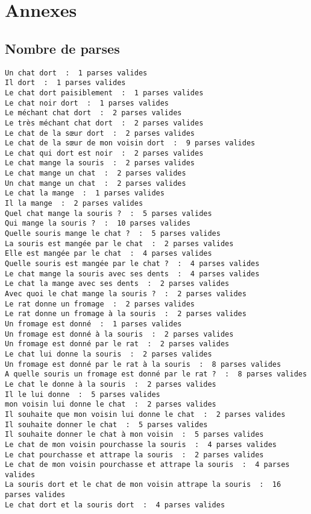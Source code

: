 \documentclass[12pt]{article}
\theoremstyle{exostyle}
\begin{document}
\section{Annexes}

\subsection{Nombre de parses}
\begin{verbatim}
Un chat dort  :  1 parses valides
Il dort  :  1 parses valides
Le chat dort paisiblement  :  1 parses valides
Le chat noir dort  :  1 parses valides
Le méchant chat dort  :  2 parses valides
Le très méchant chat dort  :  2 parses valides
Le chat de la sœur dort  :  2 parses valides
Le chat de la sœur de mon voisin dort  :  9 parses valides
Le chat qui dort est noir  :  2 parses valides
Le chat mange la souris  :  2 parses valides
Le chat mange un chat  :  2 parses valides
Un chat mange un chat  :  2 parses valides
Le chat la mange  :  1 parses valides
Il la mange  :  2 parses valides
Quel chat mange la souris ?  :  5 parses valides
Qui mange la souris ?  :  10 parses valides
Quelle souris mange le chat ?  :  5 parses valides
La souris est mangée par le chat  :  2 parses valides
Elle est mangée par le chat  :  4 parses valides
Quelle souris est mangée par le chat ?  :  4 parses valides
Le chat mange la souris avec ses dents  :  4 parses valides
Le chat la mange avec ses dents  :  2 parses valides
Avec quoi le chat mange la souris ?  :  2 parses valides
Le rat donne un fromage  :  2 parses valides
Le rat donne un fromage à la souris  :  2 parses valides
Un fromage est donné  :  1 parses valides
Un fromage est donné à la souris  :  2 parses valides
Un fromage est donné par le rat  :  2 parses valides
Le chat lui donne la souris  :  2 parses valides
Un fromage est donné par le rat à la souris  :  8 parses valides
A quelle souris un fromage est donné par le rat ?  :  8 parses valides
Le chat le donne à la souris  :  2 parses valides
Il le lui donne  :  5 parses valides
mon voisin lui donne le chat  :  2 parses valides
Il souhaite que mon voisin lui donne le chat  :  2 parses valides
Il souhaite donner le chat  :  5 parses valides
Il souhaite donner le chat à mon voisin  :  5 parses valides
Le chat de mon voisin pourchasse la souris  :  4 parses valides
Le chat pourchasse et attrape la souris  :  2 parses valides
Le chat de mon voisin pourchasse et attrape la souris  :  4 parses valides
La souris dort et le chat de mon voisin attrape la souris  :  16 parses valides
Le chat dort et la souris dort  :  4 parses valides

\end{verbatim}
\end{document}
